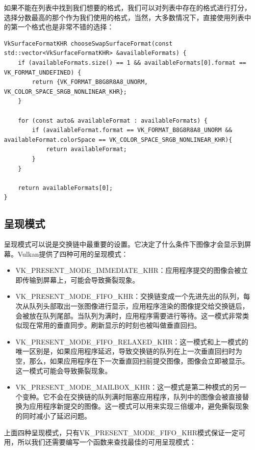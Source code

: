 \documentclass{ctexart}
\begin{document}
如果不能在列表中找到我们想要的格式，我们可以对列表中存在的格式进行打分，选择分数最高的那个作为我们使用的格式，当然，大多数情况下，直接使用列表中的第一个格式也是非常不错的选择：

\begin{lstlisting}[language={[ANSI]C}]
VkSurfaceFormatKHR chooseSwapSurfaceFormat(const std::vector<VkSurfaceFormatKHR> &availableFormats) {
	if (availableFormats.size() == 1 && availableFormats[0].format == VK_FORMAT_UNDEFINED) {
		return {VK_FORMAT_B8G8R8A8_UNORM, VK_COLOR_SPACE_SRGB_NONLINEAR_KHR};
	}

	for (const auto& availableFormat : availableFormats) {
		if (availableFormat.format == VK_FORMAT_B8G8R8A8_UNORM && availableFormat.colorSpace == VK_COLOR_SPACE_SRGB_NONLINEAR_KHR){
			return availableFormat;
		}
	}

	return availableFormats[0];
}
\end{lstlisting}

\subsection{呈现模式}

呈现模式可以说是交换链中最重要的设置。它决定了什么条件下图像才会显示到屏幕。Vulkan提供了四种可用的呈现模式：

\begin{itemize}
	\item VK\_PRESENT\_MODE\_IMMEDIATE\_KHR：应用程序提交的图像会被立即传输到屏幕上，可能会导致撕裂现象。
	\item VK\_PRESENT\_MODE\_FIFO\_KHR：交换链变成一个先进先出的队列，每次从队列头部取出一张图像进行显示，应用程序渲染的图像提交给交换链后，会被放在队列尾部。当队列为满时，应用程序需要进行等待。这一模式非常类似现在常用的垂直同步。刷新显示的时刻也被叫做垂直回扫。
	\item VK\_PRESENT\_MODE\_FIFO\_RELAXED\_KHR：这一模式和上一模式的唯一区别是，如果应用程序延迟，导致交换链的队列在上一次垂直回扫时为空，那么，如果应用程序在下一次垂直回扫前提交图像，图像会立即被显示。这一模式可能会导致撕裂现象。
	\item VK\_PRESENT\_MODE\_MAILBOX\_KHR：这一模式是第二种模式的另一个变种。它不会在交换链的队列满时阻塞应用程序，队列中的图像会被直接替换为应用程序新提交的图像。这一模式可以用来实现三倍缓冲，避免撕裂现象的同时减小了延迟问题。
\end{itemize}

上面四种呈现模式，只有VK\_PRESENT\_MODE\_FIFO\_KHR模式保证一定可用，所以我们还需要编写一个函数来查找最佳的可用呈现模式：
\end{document}
